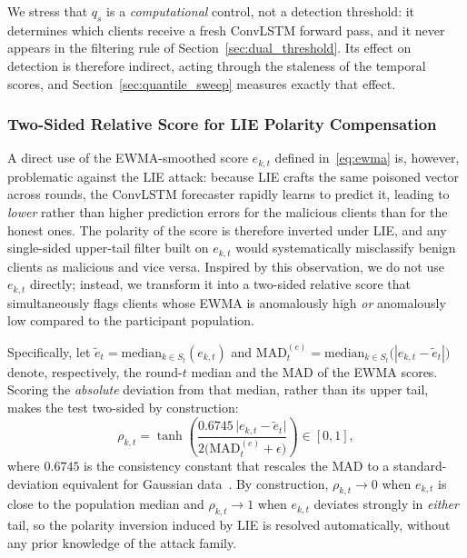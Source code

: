 \documentclass[journal]{IEEEtran}
\begin{document}
We stress that $q_s$ is a \emph{computational} control, not a detection threshold: it determines which clients receive a fresh ConvLSTM forward pass, and it never appears in the filtering rule of Section~\ref{sec:dual_threshold}. Its effect on detection is therefore indirect, acting through the staleness of the temporal scores, and Section~\ref{sec:quantile_sweep} measures exactly that effect.

\subsubsection{Two-Sided Relative Score for LIE Polarity Compensation}
A direct use of the EWMA-smoothed score $e_{k,t}$ defined in~\eqref{eq:ewma} is, however, problematic against the LIE attack: because LIE crafts the same poisoned vector across rounds, the ConvLSTM forecaster rapidly learns to predict it, leading to \emph{lower} rather than higher prediction errors for the malicious clients than for the honest ones. The polarity of the score is therefore inverted under LIE, and any single-sided upper-tail filter built on $e_{k,t}$ would systematically misclassify benign clients as malicious and vice versa. Inspired by this observation, we do not use $e_{k,t}$ directly; instead, we transform it into a two-sided relative score that simultaneously flags clients whose EWMA is anomalously high \emph{or} anomalously low compared to the participant population.

Specifically, let $\tilde{e}_t = \mathrm{median}_{k\in S_t}(e_{k,t})$ and $\mathrm{MAD}_t^{(e)} = \mathrm{median}_{k\in S_t}\bigl(|e_{k,t}-\tilde{e}_t|\bigr)$ denote, respectively, the round-$t$ median and the MAD of the EWMA scores. Scoring the \emph{absolute} deviation from that median, rather than its upper tail, makes the test two-sided by construction:
\begin{equation}
\rho_{k,t} = \tanh\!\left(\frac{0.6745\,\bigl|e_{k,t}-\tilde{e}_t\bigr|}{2\bigl(\mathrm{MAD}_t^{(e)}+\epsilon\bigr)}\right) \in [0,1],
\label{eq:rho_score}
\end{equation}
where $0.6745$ is the consistency constant that rescales the MAD to a standard-deviation equivalent for Gaussian data~\cite{nist_modified_zscore}. By construction, $\rho_{k,t} \to 0$ when $e_{k,t}$ is close to the population median and $\rho_{k,t} \to 1$ when $e_{k,t}$ deviates strongly in \emph{either} tail, so the polarity inversion induced by LIE is resolved automatically, without any prior knowledge of the attack family.
\end{document}
